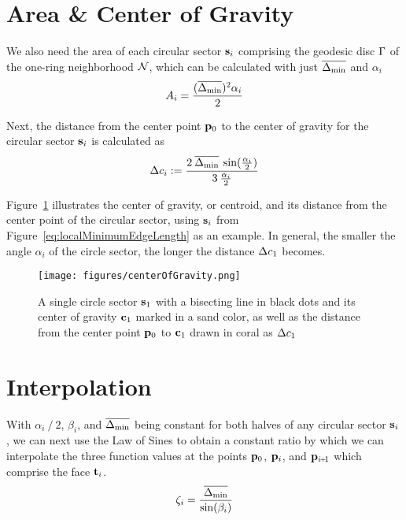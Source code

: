 \section{Area \& Center of Gravity}
\label{cFONSsACG}
We also need the area of each circular sector $\mathbf{s}_i$ comprising the geodesic disc $\Gamma$ of the one-ring neighborhood $\mathcal{N}$, which can be calculated with just $\overline{\Delta_\text{min}}$ and $\alpha_i$
\begin{equation}
	A_i = \frac{(\overline{\Delta_\text{min}})^2\alpha_i}{2}
	\label{eq:circularSectorArea}
\end{equation}
%
%

Next, the distance from the center point $\mathbf{p}_0$ to the center of gravity for the circular sector $\mathbf{s}_i$ is calculated as
\begin{equation}
	\Delta c_i := \frac{2\:\overline{\Delta_\text{min}}\:\sin(\frac{\alpha_i}{2})}{3\:\frac{\alpha_i}{2}}
	\label{eq:distToCoG}
\end{equation}
%
%

Figure~\ref{fig:centerOfGravity} illustrates the center of gravity, or centroid,  and its distance from the center point of the circular sector, using $\mathbf{s}_i$ from Figure~\ref{eq:localMinimumEdgeLength} as an example. In general, the smaller the angle $\alpha_i$ of the circle sector, the longer the distance $\Delta c_1$ becomes.
\begin{figure}[ht]
\ffigbox
	{\texttt{[image: figures/centerOfGravity.png]}}
	{\caption[Distance to and Center of Gravity]{A single circle sector $\mathbf{s}_1$ with a bisecting line in black dots and its center of gravity $\mathbf{c}_1$ marked in a sand color, as well as the distance from the center point $\mathbf{p}_0$ to $\mathbf{c}_1$ drawn in coral as $\Delta c_1$}\label{fig:centerOfGravity}}
\end{figure}%
%
%
\section{Interpolation}
\label{cFONSsI}
With $\alpha_i\mathbin{/}2$, $\beta_i$, and $\overline{\Delta_\text{min}}$ being constant for both halves of any circular sector $\mathbf{s}_i$ , we can next use the Law of Sines to obtain a constant ratio by which we can interpolate the three function values at the points $\mathbf{p}_0$, $\mathbf{p}_i$, and $\bp_{\sipo}$ which comprise the face $\mathbf{t}_i$.
\begin{equation}
	\zeta_i = \frac{\overline{\Delta_\text{min}}}{\sin(\beta_i)}
	\label{eq:zeta}
\end{equation}%
%

